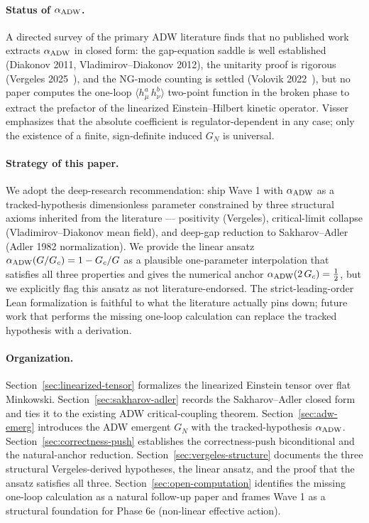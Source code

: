 \documentclass[aps,prd,twocolumn,showpacs,superscriptaddress,nofootinbib]{revtex4-2}
\newcommand{\GN}{G_{N}}
\newcommand{\aADW}{\alpha_{\rm ADW}}
\newcommand{\Gc}{G_{c}}
\begin{document}
\paragraph*{Status of $\aADW$.}
A directed survey of the primary ADW literature finds that no
published work extracts $\aADW$ in closed form: the gap-equation
saddle is well established (Diakonov 2011, Vladimirov--Diakonov 2012),
the unitarity proof is rigorous (Vergeles 2025~\cite{Vergeles2025}),
and the NG-mode counting is settled (Volovik 2022~\cite{Volovik2022Counting}),
but no paper computes the one-loop
$\langle h^{a}_{\mu}\,h^{b}_{\nu}\rangle$ two-point function in the
broken phase to extract the prefactor of the linearized
Einstein--Hilbert kinetic operator. Visser~\cite{Visser2002} emphasizes
that the absolute coefficient is regulator-dependent in any case;
only the existence of a finite, sign-definite induced $\GN$
is universal.

\paragraph*{Strategy of this paper.}
We adopt the deep-research recommendation: ship Wave 1 with $\aADW$
as a tracked-hypothesis dimensionless parameter constrained by three
structural axioms inherited from the literature --- positivity
(Vergeles), critical-limit collapse (Vladimirov--Diakonov mean field),
and deep-gap reduction to Sakharov--Adler (Adler 1982 normalization).
We provide the linear ansatz $\aADW(G/\Gc) = 1 - \Gc/G$ as a
plausible one-parameter interpolation that satisfies all three
properties and gives the numerical anchor $\aADW(2\,\Gc) = \tfrac{1}{2}$,
but we explicitly flag this ansatz as not literature-endorsed.
The strict-leading-order Lean formalization is faithful to what the
literature actually pins down; future work that performs the missing
one-loop calculation can replace the tracked hypothesis with a
derivation.

\paragraph*{Organization.}
Section~\ref{sec:linearized-tensor} formalizes the linearized
Einstein tensor over flat Minkowski. Section~\ref{sec:sakharov-adler}
records the Sakharov--Adler closed form and ties it to the existing
ADW critical-coupling theorem. Section~\ref{sec:adw-emerg} introduces
the ADW emergent $\GN$ with the tracked-hypothesis $\aADW$.
Section~\ref{sec:correctness-push} establishes the correctness-push
biconditional and the natural-anchor reduction.
Section~\ref{sec:vergeles-structure} documents the three structural
Vergeles-derived hypotheses, the linear ansatz, and the proof that
the ansatz satisfies all three. Section~\ref{sec:open-computation}
identifies the missing one-loop calculation as a natural follow-up
paper and frames Wave 1 as a structural foundation for Phase 6e
(non-linear effective action).
\end{document}
